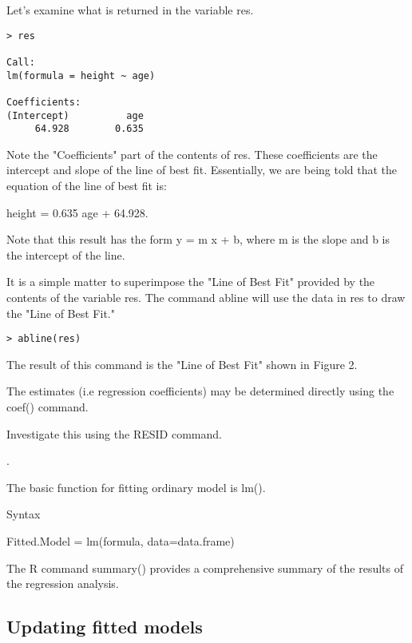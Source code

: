 Let's examine what is returned in the variable res.

\begin{framed}
\begin{verbatim}
> res

Call:
lm(formula = height ~ age)

Coefficients:
(Intercept)          age  
     64.928        0.635  

\end{verbatim}
\end{framed}

Note the "Coefficients" part of the contents of res. These coefficients are the intercept and slope of the line of best fit. Essentially, we are being told that the equation of the line of best fit is:

height = 0.635 age + 64.928.

Note that this result has the form y = m x + b, where m is the slope and b is the intercept of the line.

It is a simple matter to superimpose the "Line of Best Fit" provided by the contents of the variable res. The command abline will use the data in res to draw the "Line of Best Fit."

\begin{framed}
\begin{verbatim}
> abline(res)

\end{verbatim}
\end{framed}

The result of this command is the "Line of Best Fit" shown in Figure 2.





The estimates (i.e regression coefficients) may be determined directly using the coef() command.


Investigate this using the RESID command.

.

The basic function for fitting ordinary model is lm().

Syntax

Fitted.Model = lm(formula, data=data.frame)

The R command summary() provides a comprehensive summary of the results of the regression analysis.
\subsection{Updating fitted models}


